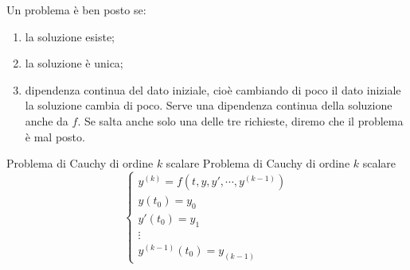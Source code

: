 \documentclass[a4paper]{article}
\begin{document}
\begin{radioactive}
Un problema è ben posto se:
\begin{enumerate}
    \item la soluzione esiste;
    \item la soluzione è unica;
    \item dipendenza continua del dato iniziale, cioè cambiando di poco
        il dato iniziale la soluzione cambia di poco.
        Serve una dipendenza continua della soluzione anche da \(f\).
        Se salta anche solo una delle tre richieste, diremo che il problema è mal posto.
\end{enumerate}
\end{radioactive}

\begin{radioactive}
\begin{snippetdefinition}{Problema di Cauchy di ordine \(k\) scalare}
    Problema di Cauchy di ordine \(k\) scalare
    \[
        \begin{cases}
            y^{(k)} = f(t,y,y',\cdots, y^{(k-1)}) \\
            y(t_0) = y_0 \\
            y'(t_0) = y_1 \\
            \vdots \\
            y^{(k-1)}(t_0) = y_{(k-1)}
        \end{cases}
    \]
\end{snippetdefinition}
\end{radioactive}
\end{document}
